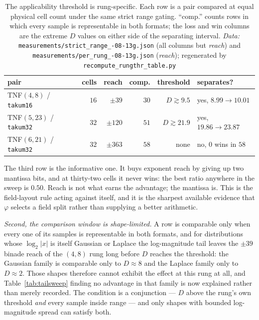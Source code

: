 \begin{table}[htbp]\centering
\caption{The applicability threshold is rung-specific. Each row is a pair
compared at equal physical cell count under the same strict range gating. ``comp.''
counts rows in which every sample is representable in both formats; the loss and
win columns are the extreme $D$ values on either side of the separating interval. \emph{Data:} \texttt{measurements/\allowbreak strict\_\allowbreak range\_-08-13g.json} (all columns but \emph{reach}) and \texttt{measurements/\allowbreak per\_\allowbreak rung\_-08-13g.json} (\emph{reach}); regenerated by \texttt{recompute\_\allowbreak rungthr\_\allowbreak table.py}}
\label{tab:rungthr}
\begin{tabular}{lrrrrl}
\hline
pair & cells & reach & comp. & threshold & separates? \\
\hline
TNF$(4,8)$ / \texttt{takum16} & $16$ & $\pm 39$ & $30$ & $D \gtrsim 9.5$ & yes, $8.99 \to 10.01$ \\
TNF$(5,23)$ / \texttt{takum32} & $32$ & $\pm 120$ & $51$ & $D \gtrsim 21.9$ & yes, $19.86 \to 23.87$ \\
TNF$(6,21)$ / \texttt{takum32} & $32$ & $\pm 363$ & $58$ & none & no, $0$ wins in $58$ \\
\hline
\end{tabular}
\end{table}

The third row is the informative one. It buys exponent reach by giving up two
mantissa bits, and at thirty-two cells it never wins: the best ratio anywhere in
the sweep is $0.50$. Reach is not what earns the advantage; the mantissa is. This
is the field-layout rule acting against itself, and it is the sharpest available
evidence that $\varphi$ selects a field split rather than supplying a better
arithmetic.

\emph{Second, the comparison window is shape-limited.} A row is comparable only
when every one of its samples is representable in both formats, and for
distributions whose $\log_2|x|$ is itself Gaussian or Laplace the log-magnitude
tail leaves the $\pm 39$ binade reach of the $(4,8)$ rung long before $D$ reaches
the threshold: the Gaussian family is comparable only to $D \approx 8$ and the
Laplace family only to $D \approx 2$. Those shapes therefore cannot exhibit the
effect at this rung at all, and Table~\ref{tab:tailsweep} finding no advantage in
that family is now explained rather than merely recorded. The condition is a
conjunction --- $D$ above the rung's own threshold \emph{and} every sample inside
range --- and only shapes with bounded log-magnitude spread can satisfy both.


